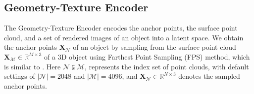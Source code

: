 

\subsection{Geometry-Texture Encoder}

The Geometry-Texture Encoder encodes the anchor points, the surface point cloud, and a set of rendered images of an object into a latent space.
%
We obtain the anchor points $\mathbf{X}_\mathcal{N}$ of an object by sampling from the surface point cloud $\mathbf{X}_\mathcal{M} \in \mathbb{R}^{M\times 3}$ of a 3D object using Farthest Point Sampling (FPS) method, which is similar to \cite{zhang20233dshape2vecset, zhang20223dilg}.
Here \( \mathcal{N} \subsetneqq \mathcal{M} \), represents the index set of point clouds, with default settings of $|\mathcal{N}|=2048$ and $ |\mathcal{M}|=4096$, and \( \mathbf{X}_\mathcal{N} \in \mathbb{R}^{N \times 3} \) denotes the sampled anchor points. 

